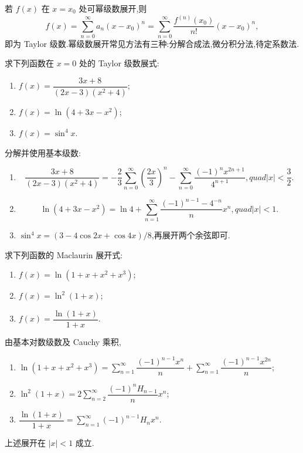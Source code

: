 \begin{remark}
    若 $f(x)$ 在 $x=x_0$ 处可幂级数展开,则
    \[
        f(x)=\sum\limits_{n=0}^{\infty}a_n(x-x_0)^n
        =\sum\limits_{n=0}^{\infty}\dfrac{f^{(n)}(x_0)}{n!}(x-x_0)^n,
    \]
    即为 Taylor 级数.幂级数展开常见方法有三种:分解合成法,微分积分法,待定系数法.
\end{remark}

\begin{example}
    求下列函数在 $x=0$ 处的 Taylor 级数展式:
    \begin{enumerate}
        \item $f(x)=\dfrac{3x+8}{(2x-3)(x^2+4)}$;
        \item $f(x)=\ln(4+3x-x^2)$;
        \item $f(x)=\sin^4x$.
    \end{enumerate}
\end{example}
\exampleblank

\begin{solution}
    分解并使用基本级数:
    \begin{enumerate}
        \item
              \[
                  \dfrac{3x+8}{(2x-3)(x^2+4)}
                  =-\dfrac{2}{3}\sum\limits_{n=0}^{\infty}\left(\dfrac{2x}{3}\right)^n
                  -\sum\limits_{n=0}^{\infty}\dfrac{(-1)^nx^{2n+1}}{4^{n+1}},quad |x|<\dfrac{3}{2}.
              \]
        \item
              \[
                  \ln(4+3x-x^2)=\ln4+\sum\limits_{n=1}^{\infty}
                  \dfrac{(-1)^{n-1}-4^{-n}}n x^n,quad |x|<1.
              \]
        \item $\displaystyle\sin^4x=(3-4\cos2x+\cos4x)/8$,再展开两个余弦即可.
    \end{enumerate}
\end{solution}

\begin{example}
    求下列函数的 Maclaurin 展开式:
    \begin{enumerate}
        \item $f(x)=\ln(1+x+x^2+x^3)$;
        \item $f(x)=\ln^2(1+x)$;
        \item $f(x)=\dfrac{\ln(1+x)}{1+x}$.
    \end{enumerate}
\end{example}
\exampleblank

\begin{solution}
    由基本对数级数及 Cauchy 乘积,
    \begin{enumerate}
        \item $\displaystyle\ln(1+x+x^2+x^3)=
                  \sum\limits_{n=1}^{\infty}\dfrac{(-1)^{n-1}x^n}{n}
                  +\sum\limits_{n=1}^{\infty}\dfrac{(-1)^{n-1}x^{2n}}n$;
        \item $\displaystyle\ln^2(1+x)=
                  2\sum\limits_{n=2}^{\infty}\dfrac{(-1)^nH_{n-1}}n x^n$;
        \item $\displaystyle\dfrac{\ln(1+x)}{1+x}=
                  \sum\limits_{n=1}^{\infty}(-1)^{n-1}H_nx^n$.
    \end{enumerate}
    上述展开在 $|x|<1$ 成立.
\end{solution}

